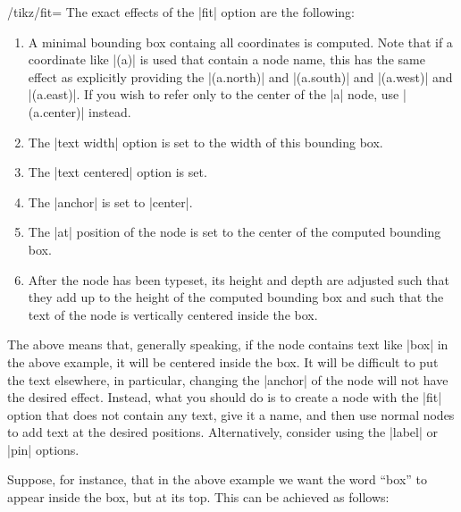\begin{key}{/tikz/fit=}
  The exact effects of the |fit| option are the following:
  \begin{enumerate}
  \item A minimal bounding box containg all coordinates is
    computed. Note that if a coordinate like |(a)| is used that
    contain a node name, this has the same effect as explicitly
    providing the |(a.north)| and |(a.south)| and |(a.west)| and
    |(a.east)|. If you wish to refer only to the center of the |a|
    node, use  |(a.center)| instead.
  \item The |text width| option is set to the width of this bounding box.
  \item The |text centered| option is set.
  \item The |anchor| is set to |center|.
  \item The |at| position of the node is set to the center of the
    computed bounding box.
  \item After the node has been typeset, its height and depth are
    adjusted such that they add up to the height of the computed
    bounding box and such that the text of the node is vertically
    centered inside the box.
  \end{enumerate}
  The above means that, generally speaking, if the node contains text
  like |box| in the above example, it will be centered inside the
  box. It will be difficult to put the text elsewhere, in particular,
  changing the |anchor| of the node will not have the desired
  effect. Instead, what you should do is to create a node with the
  |fit| option that does not contain any text, give it a name, and
  then use normal nodes to add text at the desired
  positions. Alternatively, consider using the |label| or |pin|
  options. 

  Suppose, for instance, that in the above example we want the word
  ``box'' to appear inside the box, but at its top. This can be
  achieved as follows: 
\begin{codeexample}[]
\end{codeexample}


\end{key}
